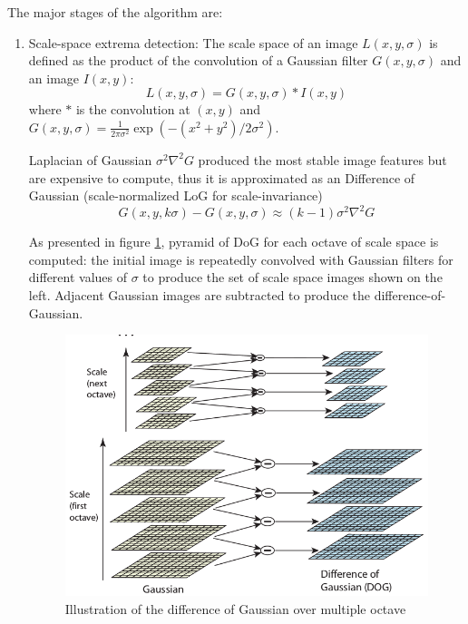 The major stages of the algorithm are:
\begin{enumerate}
    \item Scale-space extrema detection: The scale space of an image $L(x, y, \sigma)$ is defined as the product of the convolution of a Gaussian filter $G(x, y, \sigma)$ and an image $I(x, y)$:
    $$
    L(x, y, \sigma) = G(x, y, \sigma) * I(x, y)
    $$
    where $*$ is the convolution at $(x, y)$ and $G(x, y, \sigma) = \frac{1}{2 \pi \sigma^2} \exp(-(x^2 + y^2) / 2 \sigma^2)$.
    
    Laplacian of Gaussian $\sigma^2 \nabla^2 G$ produced the most stable image features but are expensive to compute, thus it is approximated as an Difference of Gaussian (scale-normalized LoG for scale-invariance)
    $$
    G(x, y, k \sigma) - G(x, y, \sigma) \approx (k - 1) \sigma^2 \nabla^2 G
    $$
    
    As presented in figure \ref{fig:sift_difference_of_gaussian}, pyramid of DoG for each octave of scale space is computed: the initial image is repeatedly convolved with Gaussian filters for different values of $\sigma$ to produce the set of scale space images shown on the left. Adjacent Gaussian images are subtracted to produce the difference-of-Gaussian.
    
    \begin{figure}[h]
        \centering
        \includegraphics[scale=0.5]{img/sift_difference_of_gaussian.png}
        \caption{Illustration of the difference of Gaussian over multiple octave}
        \label{fig:sift_difference_of_gaussian}
    \end{figure}
    

\end{enumerate}
